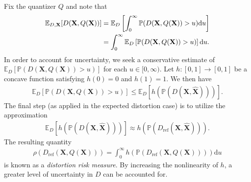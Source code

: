 \documentclass[conference]{IEEEtran}
\begin{document}
Fix the quantizer $Q$ and note that 
\begin{align}
\mathbb{E}_{D,\mathbf{X}}[D(\mathbf{X},Q(\mathbf{X}))] &= \mathbb{E}_D\left[\int_0^{\infty} \mathbb{P}(D(\mathbf{X},Q(\mathbf{X})) > u)\mathrm{d}u\right]\notag\\
&= \int_0^{\infty} \mathbb{E}_D\left[\mathbb{P}(D(\mathbf{X},Q(\mathbf{X})) > u)\right]\mathrm{d}u.
\end{align}
In order to account for uncertainty, we seek a conservative estimate of $\mathbb{E}_D\left[\mathbb{P}(D(\mathbf{X},Q(\mathbf{X})) > u)\right]$ for each $u \in [0,\infty)$. Let $h: [0,1] \rightarrow [0,1]$ be a concave function satisfying $h(0) = 0$ and $h(1) = 1$. We then have
\begin{align}
\mathbb{E}_D\left[\mathbb{P}(D(\mathbf{X},Q(\mathbf{X})) > u)\right] \leq \mathbb{E}_D\left[h\left(\mathbb{P}(D(\mathbf{X},\hat{\mathbf{X}}))\right)\right]. 
\end{align}
The final step (as applied in the expected distortion case) is to utilize the approximation
\begin{align}
\mathbb{E}_D\left[h\left(\mathbb{P}(D(\mathbf{X},\hat{\mathbf{X}}))\right)\right] \approx h\left(\mathbb{P}(D_{\mathrm{ref}}(\mathbf{X},\hat{\mathbf{X}}))\right).
\end{align}
The resulting quantity 
\begin{align}
\rho(D_{\mathrm{ref}}(\mathbf{X},Q(\mathbf{X}))) = \int_0^{\infty} h\left(\mathbb{P}(D_{\mathrm{ref}}(\mathbf{X},Q(\mathbf{X})))\right)\mathrm{d}u
\end{align}
is known as a \textit{distortion risk measure}. By increasing the nonlinearity of $h$, a greater level of uncertainty in $D$ can be accounted for. 
\end{document}
